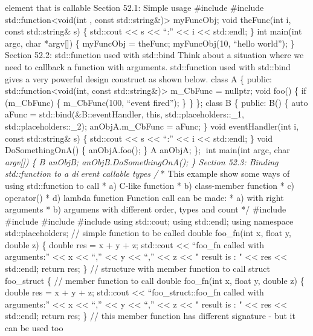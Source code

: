 element that is callable Section 52.1: Simple usage \#include \#include
std::function\textless void(int , const std::string\&)\textgreater{}
myFuncObj; void theFunc(int i, const std::string\& s) \{ std::cout
\textless\textless{} s \textless\textless{} ``:'' \textless\textless{} i
\textless\textless{} std::endl; \} int main(int argc, char *argv{[}{]})
\{ myFuncObj = theFunc; myFuncObj(10, ``hello world''); \} Section 52.2:
std::function used with std::bind Think about a situation where we need
to callback a function with arguments. std::function used with std::bind
gives a very powerful design construct as shown below. class A \{
public: std::function\textless void(int, const
std::string\&)\textgreater{} m\_CbFunc = nullptr; void foo() \{ if
(m\_CbFunc) \{ m\_CbFunc(100, ``event fired''); \} \} \}; class B \{
public: B() \{ auto aFunc = std::bind(\&B::eventHandler, this,
std::placeholders::\_1, std::placeholders::\_2); anObjA.m\_CbFunc =
aFunc; \} void eventHandler(int i, const std::string\& s) \{ std::cout
\textless\textless{} s \textless\textless{} ``:'' \textless\textless{} i
\textless\textless{} std::endl; \} void DoSomethingOnA() \{
anObjA.foo(); \} A anObjA; \}; int main(int argc, char
\emph{argv{[}{]}) \{ B anObjB; anObjB.DoSomethingOnA(); \} Section 52.3:
Binding std::function to a dierent callable types /} * This example
show some ways of using std::function to call * a) C-like function * b)
class-member function * c) operator() * d) lambda function \emph{ }
Function call can be made: * a) with right arguments * b) argumens with
different order, types and count */ \#include \#include \#include
\#include using std::cout; using std::endl; using namespace
std::placeholders; // simple function to be called double foo\_fn(int x,
float y, double z) \{ double res = x + y + z; std::cout
\textless\textless{} ``foo\_fn called with arguments:''
\textless\textless{} x \textless\textless{} ``,'' \textless\textless{} y
\textless\textless{} ``,'' \textless\textless{} z \textless\textless{} "
result is : " \textless\textless{} res \textless\textless{} std::endl;
return res; \} // structure with member function to call struct
foo\_struct \{ // member function to call double foo\_fn(int x, float y,
double z) \{ double res = x + y + z; std::cout \textless\textless{}
``foo\_struct::foo\_fn called with arguments:'' \textless\textless{} x
\textless\textless{} ``,'' \textless\textless{} y \textless\textless{}
``,'' \textless\textless{} z \textless\textless{} " result is : "
\textless\textless{} res \textless\textless{} std::endl; return res; \}
// this member function has different signature - but it can be used too
